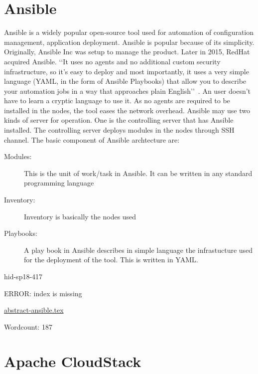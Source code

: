 \section{Ansible}
Ansible is a widely popular open-source tool used for automation of
configuration management, application deployment. Ansible is popular
because of its simplicity. Originally, Ansible Inc was setup to
manage the product. Later in 2015, RedHat acquired Ansible.
‘‘It uses no agents and no additional custom security infrastructure,
so it’s easy to deploy and most importantly, it uses a very simple
language (YAML, in the form of Ansible Playbooks) that allow you to
describe your automation jobs in a way that approaches plain
English’’~\cite{hid-sp18-417-doc-Ansible}.
An user doesn’t have to learn a cryptic language to use it.  As no
agents are required to be installed in the nodes, the tool eases the
network overhead. Ansible may use two kinds of server for operation. One is the
controlling server that has Ansible installed.  The controlling server
deploys modules in the nodes through SSH channel.
The basic component of Ansible archtecture are: 
\begin{description}
\item[Modules:] This is the unit of work/task in Ansible. It
  can be written in any standard programming language
\item[Inventory:] Inventory is basically the nodes used
\item[Playbooks:] A play book in Ansible describes in simple
  language the infrastucture used for the deployment of the tool. This
  is written in YAML. 
\end{description}


\begin{IU}

hid-sp18-417

ERROR: index is missing

\href{https://github.com/cloudmesh-community/hid-sp18-417/blob/master//technology/abstract-ansible.tex}{abstract-ansible.tex}

 

Wordcount: 187

\end{IU}


\section{Apache CloudStack}

